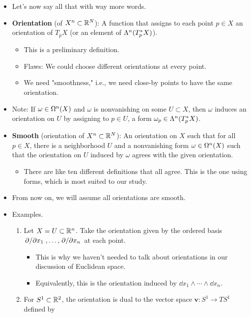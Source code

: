 \documentclass[../notes.tex]{subfiles}
\begin{document}
\begin{itemize}
\begin{enumerate}
\begin{itemize}
        \end{itemize}
    \end{enumerate}
    \item Let's now say all that with way more words.
    \item \textbf{Orientation} (of $X^n\subset\R^N$): A function that assigns to each point $p\in X$ an orientation of $T_pX$ (or an element of $\lam[n]{T_p^*X}$).
    \begin{itemize}
        \item This is a preliminary definition.
        \item Flaws: We could choose different orientations at every point.
        \item We need "smoothness," i.e., we need close-by points to have the same orientation.
    \end{itemize}
    \item Note: If $\omega\in\ome[n]{X}$ and $\omega$ is nonvanishing on some $U\subset X$, then $\omega$ induces an orientation on $U$ by assigning to $p\in U$, a form $\omega_p\in\lam[n]{T_p^*X}$.
    \item \textbf{Smooth} (orientation of $X^n\subset\R^N$): An orientation on $X$ such that for all $p\in X$, there is a neighborhood $U$ and a nonvanishing form $\omega\in\ome[n]{X}$ such that the orientation on $U$ induced by $\omega$ agrees with the given orientation.
    \begin{itemize}
        \item There are like ten different definitions that all agree. This is the one using forms, which is most suited to our study.
    \end{itemize}
    \item From now on, we will assume all orientations are smooth.
    \item Examples.
    \begin{enumerate}
        \item Let $X=U\subset\R^n$. Take the orientation given by the ordered basis $\pdv*{x_1},\dots,\pdv*{x_n}$ at each point.
        \begin{itemize}
            \item This is why we haven't needed to talk about orientations in our discussion of Euclidean space.
            \item Equivalently, this is the orientation induced by $\dd{x_1}\wedge\cdots\wedge\dd{x_n}$.
        \end{itemize}
        \item For $S^1\subset\R^2$, the orientation is dual to the vector space $\bm{v}:S^1\to TS^1$ defined by

\end{enumerate}
\end{itemize}
\end{document}
